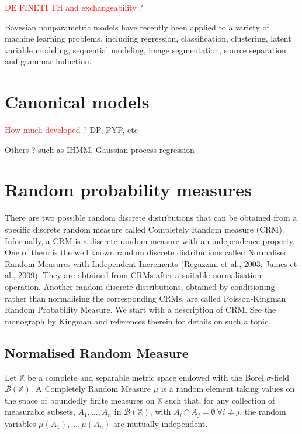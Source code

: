 \textcolor{red}{DE FINETI TH and exchangeability ?}


Bayesian nonparametric models have recently been applied to a variety of machine learning problems, including regression, classification, clustering, latent variable modeling, sequential modeling, image segmentation, source separation and grammar induction.

\section{Canonical models}
\textcolor{red}{How much developed ?}
DP, PYP, etc

Others ? such as IHMM, Gaussian process regression

\section{Random probability measures}
There are two possible random discrete distributions that can be obtained from a specific discrete random measure called Completely Random measure (CRM). Informally, a \gls{CRM} is a discrete random measure with an independence property. One of them is the well known random discrete distributions called Normalised Random Measures with Independent Increments (Regazzini et al., 2003; James et al., 2009). They are obtained from \gls{CRM}s after a suitable normalisation operation. Another random discrete distributions, obtained by conditioning rather than normalising the corresponding \gls{CRM}s, are called Poisson-Kingman Random Probability Measure.
We start with a description of \gls{CRM}.
See the monograph by Kingman \cite{kingman-poisson-processes} and references therein for details on such a topic. \\

\subsection{Normalised Random Measure}

\begin{definition} \label{def:CRM}
Let $\mathbb{X}$ be a complete and separable metric space endowed with the Borel $\sigma$-field $\mathcal{B}(\mathbb{X})$. A Completely Random Measure $\mu$ is a random element taking values on the space of boundedly finite measures on $\mathbb{X}$ such that, for any collection of measurable subsets, $A_1, \dots , A_n$ in $\mathcal{B}(\mathbb{X})$, with $A_i \cap  A_j = \emptyset \ \forall i \neq j$, the random variables $\mu(A_1), \dots, \mu(A_n)$ are mutually independent.
\end{definition}

